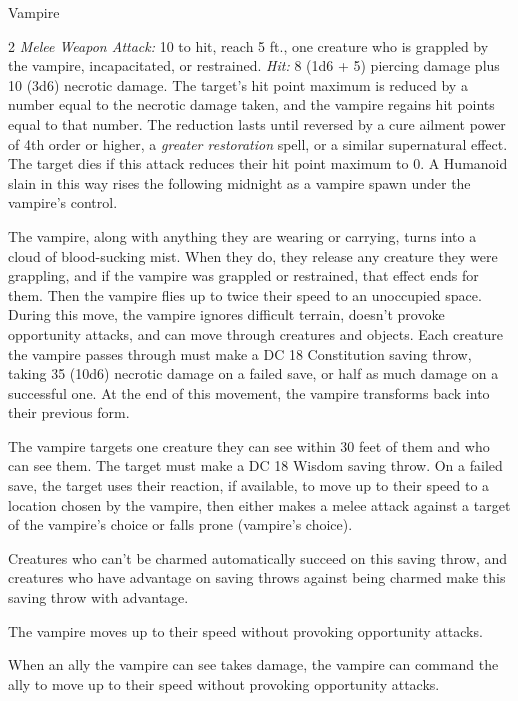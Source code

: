 \documentclass[10pt,a4paper,twoside,bg=print,twocolumn,openany,nodeprecatedcode]{dndbook}
\begin{document}
\begin{DndMonster}[float*=b,width=\textwidth + 8pt]{Vampire}
\begin{multicols}{2}
\textsl{Melee Weapon Attack:} 10 to hit, reach 5 ft., one creature who is grappled by the vampire, incapacitated, or restrained. \textsl{Hit:} 8 (1d6 + 5) piercing damage plus 10 (3d6) necrotic damage. The target's hit point maximum is reduced by a number equal to the necrotic damage taken, and the vampire regains hit points equal to that number. The reduction lasts until reversed by a cure ailment power of 4th order or higher, a \textit{greater restoration} spell, or a similar supernatural effect. The target dies if this attack reduces their hit point maximum to 0. A Humanoid slain in this way rises the following midnight as a vampire spawn under the vampire's control.

The vampire, along with anything they are wearing or carrying, turns into a cloud of blood-sucking mist. When they do, they release any creature they were grappling, and if the vampire was grappled or restrained, that effect ends for them. Then the vampire flies up to twice their speed to an unoccupied space. During this move, the vampire ignores difficult terrain, doesn't provoke opportunity attacks, and can move through creatures and objects. Each creature the vampire passes through must make a DC 18 Constitution saving throw, taking 35 (10d6) necrotic damage on a failed save, or half as much damage on a successful one. At the end of this movement, the vampire transforms back into their previous form.

The vampire targets one creature they can see within 30 feet of them and who can see them. The target must make a DC 18 Wisdom saving throw. On a failed save, the target uses their reaction, if available, to move up to their speed to a location chosen by the vampire, then either makes a melee attack against a target of the vampire's choice or falls prone (vampire's choice).

Creatures who can't be charmed automatically succeed on this saving throw, and creatures who have advantage on saving throws against being charmed make this saving throw with advantage.

The vampire moves up to their speed without provoking opportunity attacks.

When an ally the vampire can see takes damage, the vampire can command the ally to move up to their speed without provoking opportunity attacks.

\end{multicols}
\end{DndMonster}
\end{document}
